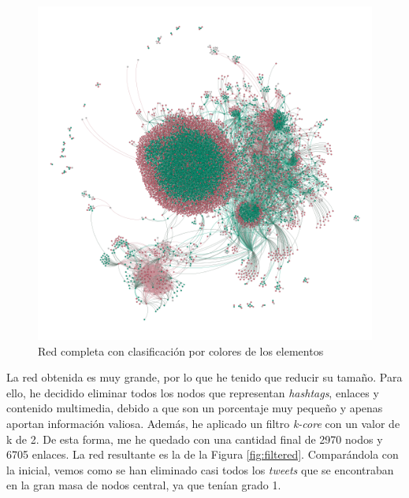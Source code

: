 \begin{figure}
    \centering
    \includegraphics[width=\textwidth]{images/graph/full.png}
    \caption{Red completa con clasificación por colores de los elementos}
    \label{fig:full}
\end{figure}

La red obtenida es muy grande, por lo que he tenido que reducir su tamaño. Para
ello, he decidido eliminar todos los nodos que representan \textit{hashtags},
enlaces y contenido multimedia, debido a que son un porcentaje muy pequeño y
apenas aportan información valiosa. Además, he aplicado un filtro
\textit{k-core} con un valor de k de 2. De esta forma, me he quedado con una
cantidad final de 2970 nodos y 6705 enlaces. La red resultante es la de la
Figura \ref{fig:filtered}. Comparándola con la inicial, vemos como se han
eliminado casi todos los \textit{tweets} que se encontraban en la gran masa de
nodos central, ya que tenían grado 1.

